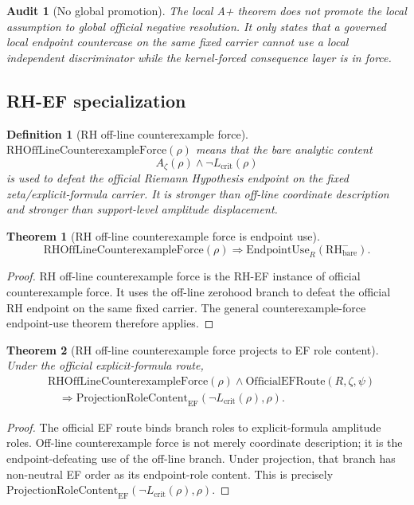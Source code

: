 \documentclass[11pt]{article}
\newtheorem{definition}{Definition}[section]
\newtheorem{theorem}{Theorem}[section]
\newtheorem{audit}{Audit}[section]
\newcommand{\Az}{A_{\zeta}}
\newcommand{\Lcrit}{L_{\mathrm{crit}}}
\newcommand{\RH}{\mathrm{RH}}
\newcommand{\EndpointUse}{\mathrm{EndpointUse}}
\newcommand{\RHOffCxForce}{\mathrm{RHOffLineCounterexampleForce}}
\newcommand{\OfficialEFRoute}{\mathrm{OfficialEFRoute}}
\newcommand{\ProjRoleEF}{\mathrm{ProjectionRoleContent}_{\mathrm{EF}}}
\begin{document}
\begin{audit}[No global promotion]
The local A+ theorem does not promote the local assumption to global official negative resolution. It only states that a governed local endpoint countercase on the same fixed carrier cannot use a local independent discriminator while the kernel-forced consequence layer is in force.
\end{audit}

\subsection{RH-EF specialization}

\begin{definition}[RH off-line counterexample force]
\(\RHOffCxForce(\rho)\) means that the bare analytic content
\[
\Az(\rho)\wedge\neg\Lcrit(\rho)
\]
is used to defeat the official Riemann Hypothesis endpoint on the fixed zeta/explicit-formula carrier. It is stronger than off-line coordinate description and stronger than support-level amplitude displacement.
\end{definition}

\begin{theorem}[RH off-line counterexample force is endpoint use]
\[
\RHOffCxForce(\rho)\Rightarrow \EndpointUse_R(\RH^-_{\mathrm{bare}}).
\]
\end{theorem}

\begin{proof}
RH off-line counterexample force is the RH-EF instance of official counterexample force. It uses the off-line zerohood branch to defeat the official RH endpoint on the same fixed carrier. The general counterexample-force endpoint-use theorem therefore applies.
\end{proof}

\begin{theorem}[RH off-line counterexample force projects to EF role content]
Under the official explicit-formula route,
\[
\begin{aligned}
&\RHOffCxForce(\rho)\wedge\OfficialEFRoute(R,\zeta,\psi)\\
&\quad\Rightarrow \ProjRoleEF(\neg\Lcrit(\rho),\rho).
\end{aligned}
\]
\end{theorem}

\begin{proof}
The official EF route binds branch roles to explicit-formula amplitude roles. Off-line counterexample force is not merely coordinate description; it is the endpoint-defeating use of the off-line branch. Under projection, that branch has non-neutral EF order as its endpoint-role content. This is precisely \(\ProjRoleEF(\neg\Lcrit(\rho),\rho)\).
\end{proof}
\end{document}
